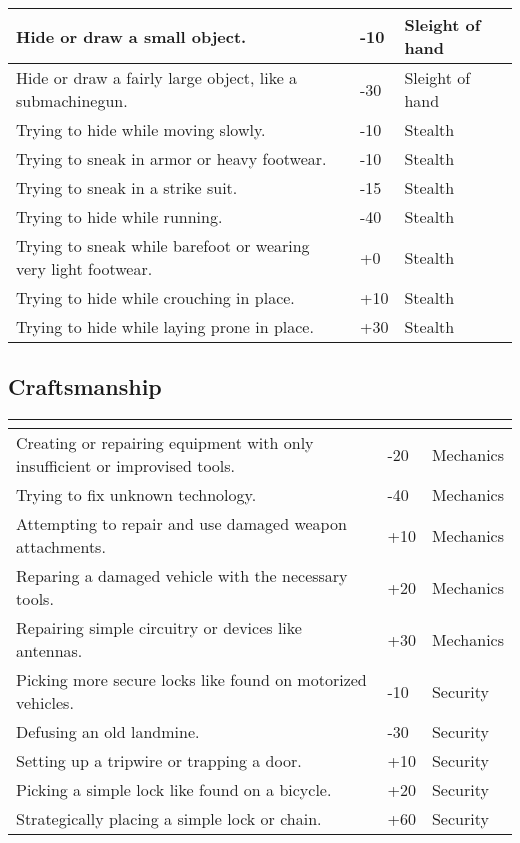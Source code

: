 \documentclass[12pt,a4paper,openany]{book}
\newcommand{\ul}[1]{\underline{\smash{#1}}}
\begin{document}
\begin{tabularx}{\textwidth}{|X|l|l|}
		Hide or draw a small object. & -10 & Sleight of hand \\ \hline
		Hide or draw a fairly large object, like a submachinegun. & -30 & Sleight of hand \\ \hline
		Trying to hide while moving slowly. & -10 & Stealth \\ \hline
		Trying to sneak in armor or heavy footwear. & -10 & Stealth \\ \hline
		Trying to sneak in a strike suit. & -15 & Stealth \\ \hline
		Trying to hide while running. & -40 & Stealth \\ \hline
		Trying to sneak while barefoot or wearing very light footwear. & +0 & Stealth \\ \hline
		Trying to hide while crouching in place. & +10 & Stealth \\ \hline
		Trying to hide while laying prone in place. & +30 & Stealth \\ \hline
	\end{tabularx}
	\subsection{Craftsmanship}
	\begin{tabularx}{\textwidth}{|X|l|l|}
		\hline
		\ul{Situation} & \ul{Modifier} & \ul{Focused skill} \\ \hline
		Creating or repairing equipment with only insufficient or improvised tools. & -20 & Mechanics \\ \hline
		Trying to fix unknown technology. & -40 & Mechanics \\ \hline
		Attempting to repair and use damaged weapon attachments. & +10 & Mechanics \\ \hline
		Reparing a damaged vehicle with the necessary tools. & +20 & Mechanics \\ \hline
		Repairing simple circuitry or devices like antennas. & +30 & Mechanics \\ \hline
		Picking more secure locks like found on motorized vehicles. & -10 & Security \\ \hline
		Defusing an old landmine. & -30 & Security \\ \hline
		Setting up a tripwire or trapping a door. & +10 & Security \\ \hline
		Picking a simple lock like found on a bicycle. & +20 & Security \\ \hline
		Strategically placing a simple lock or chain. & +60 & Security \\ \hline
	\end{tabularx}
\end{document}
